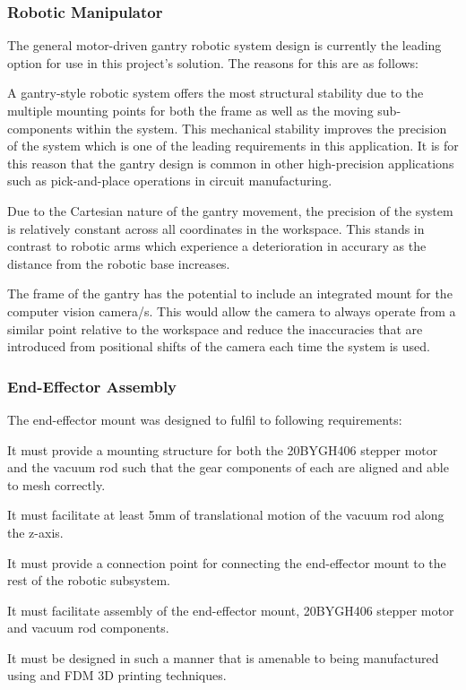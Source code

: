 \subsubsection{Robotic Manipulator}

The general motor-driven gantry robotic system design is currently the leading option for use in this project's solution. The reasons for this are as follows:

\begin{compactitem}
	\item A gantry-style robotic system offers the most structural stability due to the multiple mounting points for both the frame as well as the moving sub-components within the system. This mechanical stability improves the precision of the system which is one of the leading requirements in this application. It is for this reason that the gantry design is common in other high-precision applications such as pick-and-place operations in circuit manufacturing.
	\item Due to the Cartesian nature of the gantry movement, the precision of the system is relatively constant across all coordinates in the workspace. This stands in contrast to robotic arms which experience a deterioration in accurary as the distance from the robotic base increases.
	\item The frame of the gantry has the potential to include an integrated mount for the computer vision camera/s. This would allow the camera to always operate from a similar point relative to the workspace and reduce the inaccuracies that are introduced from positional shifts of the camera each time the system is used.
\end{compactitem}

\subsubsection{End-Effector Assembly}

The end-effector mount was designed to fulfil to following requirements:

\begin{compactitem}
	\item It must provide a mounting structure for both the 20BYGH406 stepper motor and the vacuum rod such that the gear components of each are aligned and able to mesh correctly.
	\item It must facilitate at least 5mm of translational motion of the vacuum rod along the z-axis.
	\item It must provide a connection point for connecting the end-effector mount to the rest of the robotic subsystem.
	\item It must facilitate assembly of the end-effector mount, 20BYGH406 stepper motor and vacuum rod components.
	\item It must be designed in such a manner that is amenable to being manufactured using and FDM 3D printing techniques. 
\end{compactitem}


